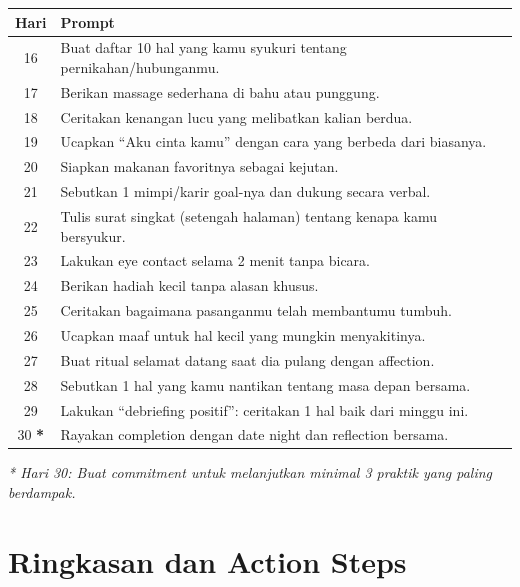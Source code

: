 \begin{exercisebox}
\renewcommand{\arraystretch}{1.4}
\begin{tabular}{|c|>{\raggedright\arraybackslash}p{10cm}|}
\hline
\rowcolor{primary!20}
\textbf{Hari} & \textbf{Prompt} \\
\hline
16 & Buat daftar 10 hal yang kamu syukuri tentang pernikahan/hubunganmu. \\
\hline
17 & Berikan massage sederhana di bahu atau punggung. \\
\hline
18 & Ceritakan kenangan lucu yang melibatkan kalian berdua. \\
\hline
19 & Ucapkan ``Aku cinta kamu'' dengan cara yang berbeda dari biasanya. \\
\hline
20 & Siapkan makanan favoritnya sebagai kejutan. \\
\hline
21 & Sebutkan 1 mimpi/karir goal-nya dan dukung secara verbal. \\
\hline
22 & Tulis surat singkat (setengah halaman) tentang kenapa kamu bersyukur. \\
\hline
23 & Lakukan eye contact selama 2 menit tanpa bicara. \\
\hline
24 & Berikan hadiah kecil tanpa alasan khusus. \\
\hline
25 & Ceritakan bagaimana pasanganmu telah membantumu tumbuh. \\
\hline
26 & Ucapkan maaf untuk hal kecil yang mungkin menyakitinya. \\
\hline
27 & Buat ritual selamat datang saat dia pulang dengan affection. \\
\hline
28 & Sebutkan 1 hal yang kamu nantikan tentang masa depan bersama. \\
\hline
29 & Lakukan ``debriefing positif'': ceritakan 1 hal baik dari minggu ini. \\
\hline
30 \textbf{*} & Rayakan completion dengan date night dan reflection bersama. \\
\hline
\end{tabular}

\vspace{0.5cm}
\textit{* Hari 30: Buat commitment untuk melanjutkan minimal 3 praktik yang paling berdampak.}
\end{exercisebox}

\section{Ringkasan dan Action Steps}

